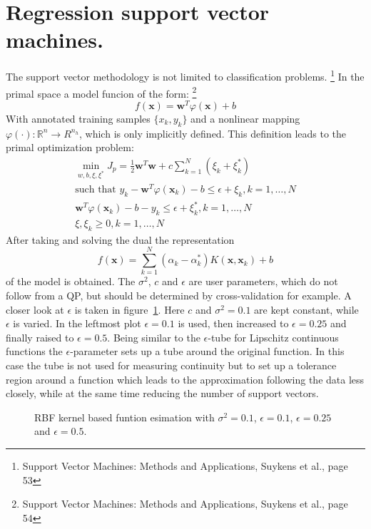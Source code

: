 \section{Regression support vector machines.}
The support vector methodology is not limited to classification problems. \footnote{Support Vector Machines: Methods and Applications, Suykens et al., page 53} In the primal space a model funcion of the form: \footnote{Support Vector Machines: Methods and Applications, Suykens et al., page 54}
\begin{equation}
f(\mathbf{x}) = \mathbf{w}^T \varphi(\mathbf{x}) + b 
\end{equation}
With annotated training samples $\{x_k,y_k\}$ and a nonlinear mapping $\varphi(\cdot) : \mathbb{R}^n \rightarrow R^{n_h}$, which is only implicitly defined. This definition leads to the primal optimization problem:
\begin{align}
\min_{w, b, \xi, \xi^{*}} J_p = \frac{1}{2} \mathbf{w}^T\mathbf{w} + c\sum_{k=1}^{N}(\xi_k + \xi_k^{*}) \\
\text{such that } y_k - \mathbf{w}^T\varphi(\mathbf{x}_k) - b \leq \epsilon  + \xi_k , k = 1,\dots,N \\ 
\mathbf{w}^T\varphi(\mathbf{x}_k) - b - y_k \leq \epsilon  + \xi_k^{*} , k = 1,\dots,N \\
\xi, \xi_k \geq 0 , k = 1,\dots,N
\end{align}
After taking and solving the dual the representation
\begin{equation}
f(\mathbf{x}) = \sum\limits_{k=1}^{N} (\alpha_k - \alpha_k^{*})K(\mathbf{x},\mathbf{x}_k) + b
\label{eq:Ksum}
\end{equation}
of the model is obtained. The $\sigma^2$, $c$ and $\epsilon$ are user parameters, which do not follow from a QP, but should be determined by cross-validation for example. A closer look at $\epsilon$ is taken in figure~\ref{fig:ebfEstEps}. Here $c$ and $\sigma^2 = 0.1$ are kept constant, while $\epsilon$ is varied. In the leftmost plot $\epsilon = 0.1$ is used, then increased to $\epsilon = 0.25$ and finally raised to $\epsilon = 0.5$. Being similar to the $\epsilon$-tube for Lipschitz continuous functions the $\epsilon$-parameter sets up a tube around the original function. In this case the tube is not used for measuring continuity but to set up a tolerance region around a function which leads to the approximation following the data less closely, while at the same time reducing the number of support vectors. 
\begin{figure}
\centering



\caption{RBF kernel based funtion esimation with $\sigma^2 = 0.1$, $\epsilon = 0.1$, $\epsilon = 0.25$ and $\epsilon = 0.5$.}
\label{fig:ebfEstEps}
\end{figure}
